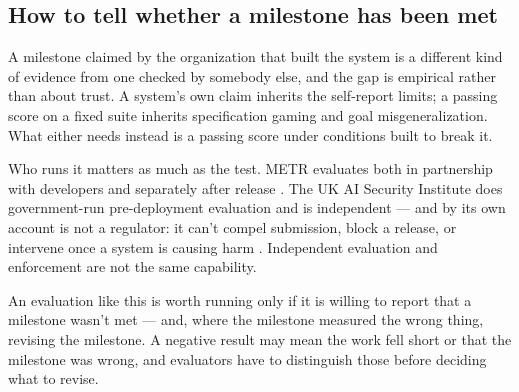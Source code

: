 \subsection{How to tell whether a milestone has been met}
\label{sec:28.1.2}
A milestone claimed by the organization that built the system is a different kind of evidence from one checked by somebody else, and the gap is empirical rather than about trust. A system's own claim inherits the self-report limits; a passing score on a fixed suite inherits specification gaming and goal misgeneralization. What either needs instead is a passing score under conditions built to break it.

Who runs it matters as much as the test. METR evaluates both in partnership with developers and separately after release \autocite{metr2026about}. The UK AI Security Institute does government-run pre-deployment evaluation and is independent — and by its own account is not a regulator: it can't compel submission, block a release, or intervene once a system is causing harm \autocite{aisi2025governance}. Independent evaluation and enforcement are not the same capability.

An evaluation like this is worth running only if it is willing to report that a milestone wasn't met — and, where the milestone measured the wrong thing, revising the milestone. A negative result may mean the work fell short or that the milestone was wrong, and evaluators have to distinguish those before deciding what to revise.
